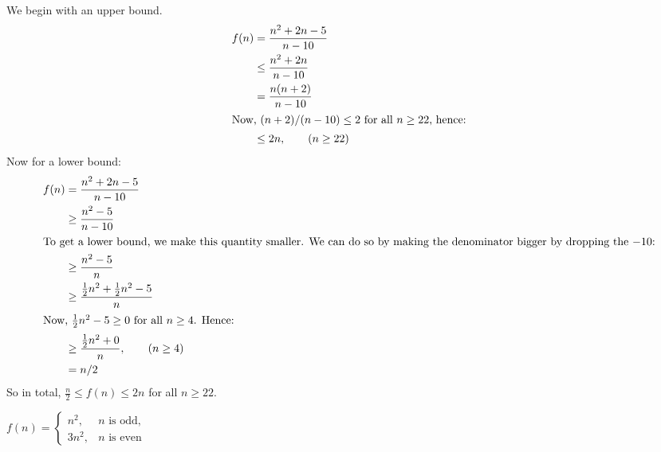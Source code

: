 \begin{prob}
\begin{subprobset}
\begin{subprob}
\begin{soln}
                We begin with an upper bound.
                \begin{align*}
                    f(n)
                    &=
                        \frac{n^2 + 2n - 5}{n - 10}
                        \\
                    &\leq
                        \frac{n^2 + 2n}{n - 10}
                        \\
                    &=
                        \frac{n(n + 2)}{n - 10}
                        \\
                        \intertext{Now, $(n+2)/(n-10) \leq 2$ for all $n \geq 22$, hence:}
                    &\leq
                        2 n, \qquad (n \geq 22)
                        \\
                \end{align*}
                Now for a lower bound:
                \begin{align*}
                    f(n)
                    &=
                        \frac{n^2 + 2n - 5}{n - 10}
                        \\
                    &\geq
                        \frac{n^2 - 5}{n - 10}
                        \\
                    \intertext{To get a lower bound, we make this
                    quantity smaller. We can do so by making the
                    denominator bigger by dropping the $-10$:}
                    &\geq
                        \frac{n^2 - 5}{n}
                        \\
                    &\geq
                    \frac{\frac{1}{2}n^2  + \frac{1}{2}n^2 - 5}{n}
                        \\
                        \intertext{Now, $\frac{1}{2}n^2 -5 \geq 0$ for all $n \geq 4$. Hence:}
                    &\geq
                \frac{\frac{1}{2}n^2  + 0}{n}, \qquad (n \geq 4)
                        \\
                    &= n/2
                \end{align*}
                So in total, $\frac{n}{2} \leq f(n) \leq 2n$ for all $n \geq 22$.
            \end{soln}
            
        \end{subprob}

        \begin{subprob}
            $
            \displaystyle
            f(n) = 
            \begin{cases}
                n^2, & n \text{ is odd},\\
                3n^2, & n \text{ is even}
            \end{cases}
            $


\end{subprob}
\end{subprobset}
\end{prob}
